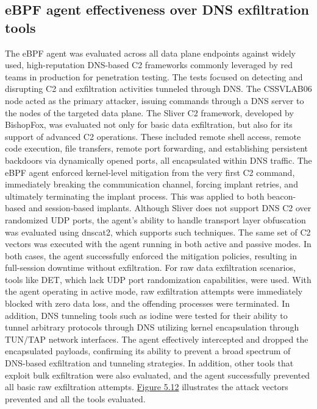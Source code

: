 \documentclass [11pt, proquest] {uwthesis}[2020/02/24]
\begin{document}
\subsection{eBPF agent effectiveness over DNS exfiltration tools}
The eBPF agent was evaluated across all data plane endpoints against widely used, high-reputation DNS-based C2 frameworks commonly leveraged by red teams in production for penetration testing. The tests focused on detecting and disrupting C2 and exfiltration activities tunneled through DNS. The CSSVLAB06 node acted as the primary attacker, issuing commands through a DNS server to the nodes of the targeted data plane.
The Sliver C2 framework, developed by BishopFox, was evaluated not only for basic data exfiltration, but also for its support of advanced C2 operations. These included remote shell access, remote code execution, file transfers, remote port forwarding, and establishing persistent backdoors via dynamically opened ports, all encapsulated within DNS traffic. The eBPF agent enforced kernel-level mitigation from the very first C2 command, immediately breaking the communication channel, forcing implant retries, and ultimately terminating the implant process. This was applied to both beacon-based and session-based implants.
Although Sliver does not support DNS C2 over randomized UDP ports, the agent’s ability to handle transport layer obfuscation was evaluated using dnscat2, which supports such techniques. The same set of C2 vectors was executed with the agent running in both active and passive modes. In both cases, the agent successfully enforced the mitigation policies, resulting in full-session downtime without exfiltration.
For raw data exfiltration scenarios, tools like DET, which lack UDP port randomization capabilities, were used. With the agent operating in active mode, raw exfiltration attempts were immediately blocked with zero data loss, and the offending processes were terminated. In addition, DNS tunneling tools such as iodine were tested for their ability to tunnel arbitrary protocols through DNS utilizing kernel encapsulation through TUN/TAP network interfaces. The agent effectively intercepted and dropped the encapsulated payloads, confirming its ability to prevent a broad spectrum of DNS-based exfiltration and tunneling strategies. In addition, other tools that exploit bulk exfiltration were also evaluated, and the agent successfully prevented all basic raw exfiltration attempts.
\hyperref[tab:dns-framework-coverage]{Figure 5.12} illustrates the attack vectors prevented and all the tools evaluated. 
\end{document}
